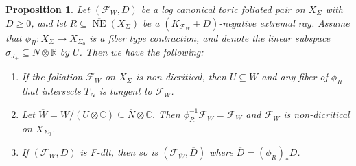 \documentclass[12pt,reqno]{amsart}
\newtheorem{proposition}[theorem]{Proposition}
\theoremstyle{definition}
\newcommand{\mc}{\mathcal}
\newcommand{\on}{\operatorname}
\newcommand\cF{{\mathcal{F}}}
\newcommand\bC{{\mathbb C}}
\newcommand\bR{{\mathbb R}}
\begin{document}
\begin{proposition}\label{MFS}
    Let $(\cF_W,D)$ be a log canonical toric foliated pair on $X_\Sigma$ with $D\geq 0$, and let $R\subseteq\overline{\on{NE}}(X_\Sigma)$ be a $(K_{\cF_W}+D)$-negative extremal ray. 
    Assume that  $\phi_R\colon X_\Sigma\to X_{\Sigma_0}$ is a fiber type contraction, and  
    denote the linear subspace $\sigma_{J_+}\subseteq N\otimes\bR$ by $U$.
    Then we have the following: 
    \begin{enumerate}
        \item If the foliation $\cF_W$ on $X_\Sigma$ is non-dicritical, then $U\subseteq W$ and any fiber of $\phi_R$ that intersects $T_N$ is tangent to $\cF_W$.
        \item Let $\overline{W} = W/(U\otimes\bC)\subseteq \overline{N}\otimes\bC$. Then $\phi_R^{-1}\cF_{\overline{W}}=\mc F_W$ and $\cF_{\overline{W}}$ is non-dicritical on $X_{\Sigma_0}$. 
        \item If $(\cF_W,D)$ is F-dlt, then so is $(\cF_{\overline{W}},\overline{D})$ where $\overline{D}=(\phi_R)_*D$. 
    \end{enumerate}
\end{proposition}
\end{document}
